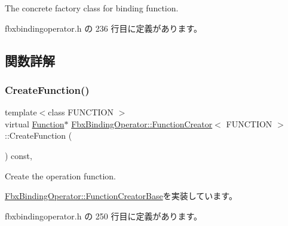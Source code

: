 The concrete factory class for binding function. 

 fbxbindingoperator.\+h の 236 行目に定義があります。



\subsection{関数詳解}
\mbox{\label{class_fbx_binding_operator_1_1_function_creator_a0d7fd7fb26969b0b2a46b6a44e6e2ac8}} 
\subsubsection{\texorpdfstring{Create\+Function()}{CreateFunction()}}
{\footnotesize\ttfamily template$<$class F\+U\+N\+C\+T\+I\+ON $>$ \\
virtual \hyperlink{class_fbx_binding_operator_1_1_function}{Function}$\ast$ \hyperlink{class_fbx_binding_operator_1_1_function_creator}{Fbx\+Binding\+Operator\+::\+Function\+Creator}$<$ F\+U\+N\+C\+T\+I\+ON $>$\+::Create\+Function (\begin{DoxyParamCaption}{ }\end{DoxyParamCaption}) const\hspace{0.3cm}{\ttfamily [inline]}, {\ttfamily [virtual]}}

Create the operation function. 

\hyperlink{class_fbx_binding_operator_1_1_function_creator_base_a092cb78156b31c356d929c3cfa9ff077}{Fbx\+Binding\+Operator\+::\+Function\+Creator\+Base}を実装しています。



 fbxbindingoperator.\+h の 250 行目に定義があります。

\mbox{\label{class_fbx_binding_operator_1_1_function_creator_ae54e4bf8030e91bcd1b6fe5e9126be9d}} 
